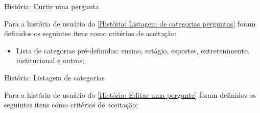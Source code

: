 \def\arraystretch{2}
\begin{quadro}[htb]
\centering
\ABNTEXfontereduzida
\caption[História: Curtir uma pergunta]{História: Curtir uma pergunta}
\label{História: Curtir uma pergunta}
\end{quadro}
\FloatBarrier 

Para a história de usuário do \autoref{História: Listagem de categorias perguntas} foram definidos os seguintes itens como critérios de aceitação:

\begin{itemize}
\item Lista de categorias pré-definidas: ensino, estágio, esportes, entretenimento, institucional e outros;  
\end{itemize}

\def\arraystretch{2}
\begin{quadro}[htb]
\centering
\ABNTEXfontereduzida
\caption[História: Listagem de categorias]{História: Listagem de categorias}
\label{História: Listagem de categorias perguntas}
\end{quadro}
\FloatBarrier 

Para a história de usuário do \autoref{História: Editar uma pergunta} foram definidos os seguintes itens como critérios de aceitação:

